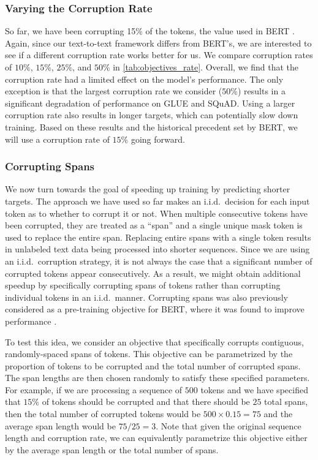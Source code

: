 \subsubsection{Varying the Corruption Rate}
\label{sec:corruption_rate}

So far, we have been corrupting 15\% of the tokens, the value used in BERT \citep{devlin2018bert}. Again, since our text-to-text framework differs from BERT's, we are interested to see if a different corruption rate works better for us. We compare corruption rates of $10\%$, $15\%$, $25\%$, and $50\%$ in \ref{tab:objectives_rate}.
Overall, we find that the corruption rate had a limited effect on the model's performance. The only exception is that the largest corruption rate we consider ($50\%$) results in a significant degradation of performance on GLUE and SQuAD. Using a larger corruption rate also results in longer targets, which can potentially slow down training. Based on these results and the historical precedent set by BERT, we will use a corruption rate of $15\%$ going forward.

\subsubsection{Corrupting Spans}
\label{sec:objective_spans}

We now turn towards the goal of speeding up training by predicting shorter targets. The approach we have used so far makes an i.i.d.\ decision for each input token as to whether to corrupt it or not. When multiple consecutive tokens have been corrupted, they are treated as a ``span'' and a single unique mask token is used to replace the entire span. Replacing entire spans with a single token results in unlabeled text data being processed into shorter sequences. Since we are using an i.i.d.\ corruption strategy, it is not always the case that a significant number of corrupted tokens appear consecutively. As a result, we might obtain additional speedup by specifically corrupting spans of tokens rather than corrupting individual tokens in an i.i.d.\ manner. Corrupting spans was also previously considered as a pre-training objective for BERT, where it was found to improve performance \citep{joshi2019spanbert}.

To test this idea, we consider an objective that specifically corrupts contiguous, randomly-spaced spans of tokens. This objective can be parametrized by the proportion of tokens to be corrupted and the total number of corrupted spans. The span lengths are then chosen randomly to satisfy these specified parameters. For example, if we are processing a sequence of $500$ tokens and we have specified that $15\%$ of tokens should be corrupted and that there should be $25$ total spans, then the total number of corrupted tokens would be $500 \times 0.15 = 75$ and the average span length would be $75 / 25 = 3$. Note that given the original sequence length and corruption rate, we can equivalently parametrize this objective either by the average span length or the total number of spans.

